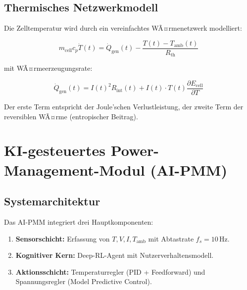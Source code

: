 ﻿\documentclass[12pt,a4paper]{article}
\begin{document}
	\subsection{Thermisches Netzwerkmodell}
	
	Die Zelltemperatur wird durch ein vereinfachtes WÃ¤rmenetzwerk modelliert:
	
	\begin{equation}
		m_\mathrm{cell} c_p \dot{T}(t) = \dot{Q}_\mathrm{gen}(t) - \frac{T(t) - T_\mathrm{amb}(t)}{R_\mathrm{th}}
		\label{eq:thermal_model}
	\end{equation}
	
	mit WÃ¤rmeerzeugungsrate:
	
	\begin{equation}
		\dot{Q}_\mathrm{gen}(t) = I(t)^2 R_\mathrm{int}(t) +
		I(t)\cdot T(t)\frac{\partial E_\mathrm{cell}}{\partial T}
		\label{eq:heat_gen}
	\end{equation}
	
	Der erste Term entspricht der Joule'schen Verlustleistung, der zweite Term
	der reversiblen WÃ¤rme (entropischer Beitrag).
	
	\section{KI-gesteuertes Power-Management-Modul (AI-PMM)}
	\label{sec:ai_pmm}
	
	\subsection{Systemarchitektur}
	
	Das AI-PMM integriert drei Hauptkomponenten:
	
	\begin{enumerate}[leftmargin=*, label=(\Roman*)]
		\item \textbf{Sensorschicht:} Erfassung von $T, V, I, T_\mathrm{amb}$
		mit Abtastrate $f_s = 10\,\mathrm{Hz}$.
		\item \textbf{Kognitiver Kern:} Deep-RL-Agent mit Nutzerverhaltensmodell.
		\item \textbf{Aktionsschicht:} Temperaturregler (PID + Feedforward) und
		Spannungsregler (Model Predictive Control).
	\end{enumerate}
	
\end{document}
